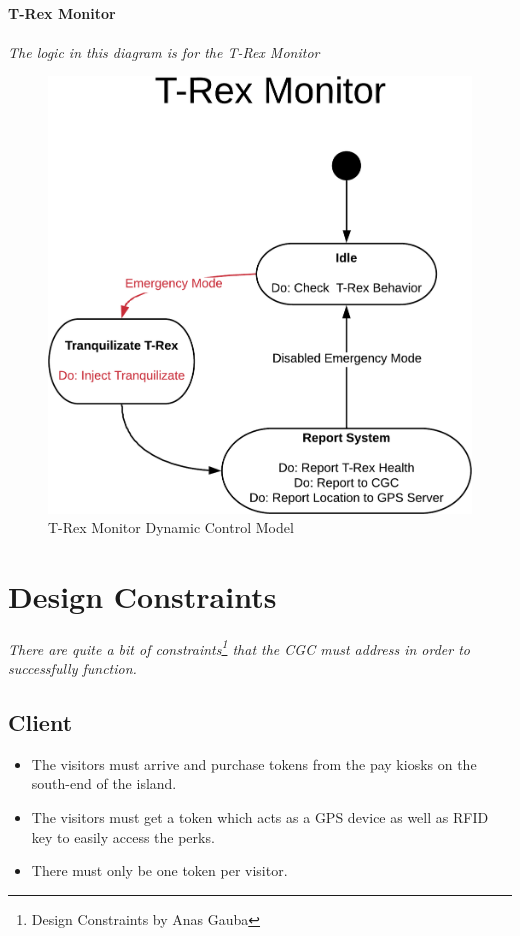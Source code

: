 \documentclass[12pt]{article}
\begin{document}
    \paragraph{T-Rex Monitor}
    \paragraph{}\textit{The logic in this diagram is for the T-Rex Monitor}   
    \begin{figure}[H]
         \centerline{\includegraphics[scale=0.80]{T-RexMonitor.png}}
         \caption{T-Rex Monitor Dynamic Control Model}
          \label{fig:trexmonitor}
    \end{figure}

\section{Design Constraints} \label{cons} 
\paragraph{} \textit{There are quite a bit of constraints\footnote{Design Constraints by Anas Gauba} that the CGC must address in order to successfully function.}

    \subsection{Client}
    \begin{itemize}
        \item The visitors must arrive and purchase tokens from the pay kiosks on the south-end of the island. 
        \item The visitors must get a token which acts as a GPS device as well as RFID key to easily access the perks. 
        \item There must only be one token per visitor.
    \end{itemize}
\end{document}
